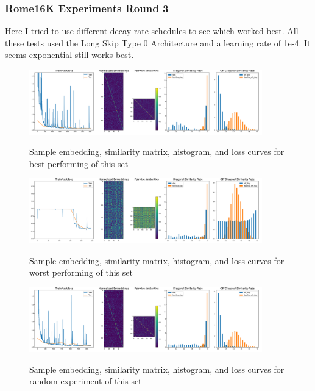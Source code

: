 \documentclass[a4paper]{article}
\begin{document}
\subsubsection*{Rome16K Experiments Round 3}
Here I tried to use different decay rate schedules to see which worked best. All these tests used the Long Skip Type 0 Architecture and a learning rate of 1e-4. It seems exponential still works best.

\begin{figure}[H]
  \includegraphics[width=0.9\textwidth]{figures/rome16kknn0-longskip0-lr-1e-4-type-exponential-steps-3e-1-0}
  \label{fig:rome16kknn0-longskip0-lr-1e-4-type-exponential-steps-3e-1-0-sub1}
  \caption{Sample embedding, similarity matrix, histogram, and loss curves for best performing of this set}
\end{figure}
\begin{figure}[H]
  \includegraphics[width=0.9\textwidth]{figures/rome16kknn0-longskip0-lr-1e-4-type-fixed-steps-1e0-0}
  \label{fig:rome16kknn0-longskip0-lr-1e-4-type-fixed-steps-1e0-0-sub1}
  \caption{Sample embedding, similarity matrix, histogram, and loss curves for worst performing of this set}
\end{figure}
\begin{figure}[H]
  \includegraphics[width=0.9\textwidth]{figures/rome16kknn0-longskip0-lr-1e-4-type-exponential-steps-1e0-0}
  \label{fig:rome16kknn0-longskip0-lr-1e-4-type-exponential-steps-1e0-0-sub1}
  \caption{Sample embedding, similarity matrix, histogram, and loss curves for random experiment of this set}
\end{figure}
\end{document}
